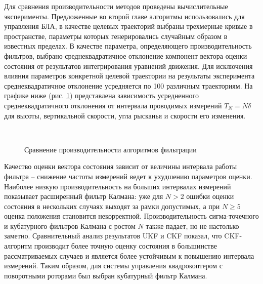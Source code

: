 Для сравнения производительности методов проведены вычислительные эксперименты.
Предложенные во второй главе алгоритмы использовались для управления БЛА, в качестве целевых траекторий выбраны трехмерные кривые в пространстве, параметры которых генерировались случайным образом в известных пределах. В качестве параметра, определяющего производительность фильтров,
выбрано среднеквадратичное отклонение компонент вектора оценки состояния от результатов интегрирования уравнений движения.
Для исключения влияния параметров конкретной целевой траектории на результаты эксперимента среднеквадратичное отклонение усредняется по 100 различным траекториям.
На графике ниже (рис. \ref{fig:est_cmpr}) представлена зависимость усредненного среднеквадратичного отклонения от интервала проводимых измерений $T_N = N\delta$ для высоты, вертикальной скорости, угла рысканья и скорости его изменения.

\begin{figure}[H]
	\begin{minipage}[h]{0.49\linewidth}
	\end{minipage}
	\hfill
	\begin{minipage}[h]{0.49\linewidth}
	\end{minipage}
	\\
	\begin{minipage}[h]{0.49\linewidth}
	\end{minipage}
	\hfill
	\begin{minipage}[h]{0.49\linewidth}
	\end{minipage}
	\caption{Сравнение производительности алгоритмов фильтрации}
	\label{fig:est_cmpr}
\end{figure}

Качество оценки вектора состояния зависит от величины интервала работы фильтра --
снижение частоты измерений ведет к ухудшению параметров оценки.
Наиболее низкую производительность на больших интервалах измерений показывает расширенный фильтр Калмана:
уже для $N>2$ ошибки оценки состояния в нескольких случаях выходят за рамки допустимых,
а при $N \geq 5$ оценка положения становится некорректной.
Производительность сигма-точечного и кубатурного фильтров Калмана с ростом $N$ также падает,
но не настолько заметно.
Сравнительный анализ результатов UKF и CKF показал, что CKF-алгоритм производит более точную оценку состояния
в большинстве рассматриваемых случаев и является более устойчивым к повышению интервала измерений.
Таким образом, для системы управления квадрокоптером с поворотными роторами был выбран кубатурный фильтр Калмана.

